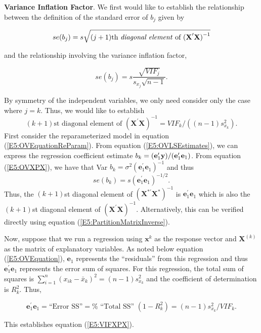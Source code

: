 \textbf{Variance Inflation Factor}. We first would like to establish the
relationship between the definition of the standard error of $b_{j}$ given by
\begin{center}
\[
se(b_{j})=s\sqrt{(j+1)\text{th \textit{diagonal element} of }\mathbf{(X}%
^{\prime }\mathbf{X)}^{-1}}
\]
\end{center}
and the relationship involving the variance inflation factor,
\begin{center}
\[
se(b_{j})=s\frac{\sqrt{VIF_{j}}}{s_{x_{j}}\sqrt{n-1}}.
\]
\end{center}
By symmetry of the independent variables, we only need consider only
the case where $j=k$. Thus, we would like to establish
\begin{equation}\label{E5:VIFXPX}
(k+1)\text{st diagonal element of }(\mathbf{X}^{\prime }\mathbf{X}%
)^{-1}=VIF_{k}/((n-1)s_{x_{k}}^{2}).
\end{equation}
First consider the reparameterized model in equation
(\ref{E5:OVEquationReParam}). From equation
(\ref{E5:OVLSEstimates}), we can express the regression coefficient estimate $b_{k}=(\mathbf{%
e}_{1}^{\prime }\mathbf{y})/(\mathbf{e}_{1}^{\prime }\mathbf{%
e}_{1})$. From equation (\ref{E5:OVXPX}), we have that Var $b_{k}=\sigma ^{2}(%
\mathbf{e}_{1}^{\prime }\mathbf{e}_{1})^{-1}$ and thus
\begin{equation}\label{E5:StdErrorReparam}
se(b_{k})=s(\mathbf{e}_{1}^{\prime }\mathbf{e}_{1})^{-1/2}.
\end{equation}
Thus, the $(k+1)$st diagonal element of $(\mathbf{X}^{\ast \prime }\mathbf{X}%
^{\ast })^{-1}$ is $\mathbf{e}_{1}^{\prime }\mathbf{e}_{1}$
which is also the $(k+1)$st diagonal element of $(\mathbf{X}^{\prime }%
\mathbf{X})^{-1}$. Alternatively, this can be verified directly
using equation (\ref{E5:PartitionMatrixInverse}).

Now, suppose that we run a regression using $\mathbf{x}^{k}$ as the
response vector and $\mathbf{X}^{(k)}$ as the matrix of explanatory
variables. As noted below equation (\ref{E5:OVEquation}),
$\mathbf{e}_{1}$
represents the ``residuals'' from this regression and thus $\mathbf{e}%
_{1}^{\prime }\mathbf{e}_{1}$ represents the error sum of squares.
For
this regression, the total sum of squares is $\sum_{i=1}^{n}(x_{ik}-\bar{x}%
_{k})^{2}=(n-1)s_{x_{k}}^{2}$ and the coefficient of determination is $%
R_{k}^{2}$. Thus,
\begin{center}
\[
\mathbf{e}_{1}^{\prime }\mathbf{e}_{1}=\text{``Error SS''}=\text{%
``Total SS'' }(1-R_{k}^{2})=(n-1)s_{x_{k}}^{2}/VIF_{k}.
\]
\end{center}
This establishes equation (\ref{E5:VIFXPX}).



